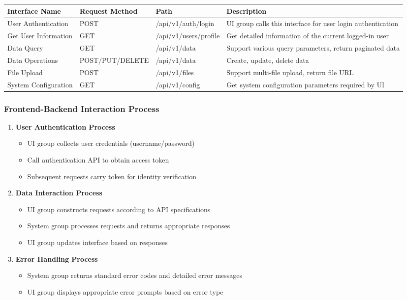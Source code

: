 \documentclass[a4paper,12pt]{article}
\begin{document}
\begin{longtable}{|p{3cm}|p{2.5cm}|p{2.5cm}|p{7cm}|}
\hline
\textbf{Interface Name} & \textbf{Request Method} & \textbf{Path} & \textbf{Description} \\
\hline
\endhead
User Authentication & POST & /api/v1/auth/login & UI group calls this interface for user login authentication \\
\hline
Get User Information & GET & /api/v1/users/profile & Get detailed information of the current logged-in user \\
\hline
Data Query & GET & /api/v1/data & Support various query parameters, return paginated data \\
\hline
Data Operations & POST/PUT/DELETE & /api/v1/data & Create, update, delete data \\
\hline
File Upload & POST & /api/v1/files & Support multi-file upload, return file URL \\
\hline
System Configuration & GET & /api/v1/config & Get system configuration parameters required by UI \\
\hline
\end{longtable}

\subsubsection{Frontend-Backend Interaction Process}

\begin{enumerate}
  \item \textbf{User Authentication Process}
  \begin{itemize}
    \item UI group collects user credentials (username/password)
    \item Call authentication API to obtain access token
    \item Subsequent requests carry token for identity verification
  \end{itemize}
  
  \item \textbf{Data Interaction Process}
  \begin{itemize}
    \item UI group constructs requests according to API specifications
    \item System group processes requests and returns appropriate responses
    \item UI group updates interface based on responses
  \end{itemize}
  
  \item \textbf{Error Handling Process}
  \begin{itemize}
    \item System group returns standard error codes and detailed error messages
    \item UI group displays appropriate error prompts based on error type
  \end{itemize}
\end{enumerate}
\end{document}
